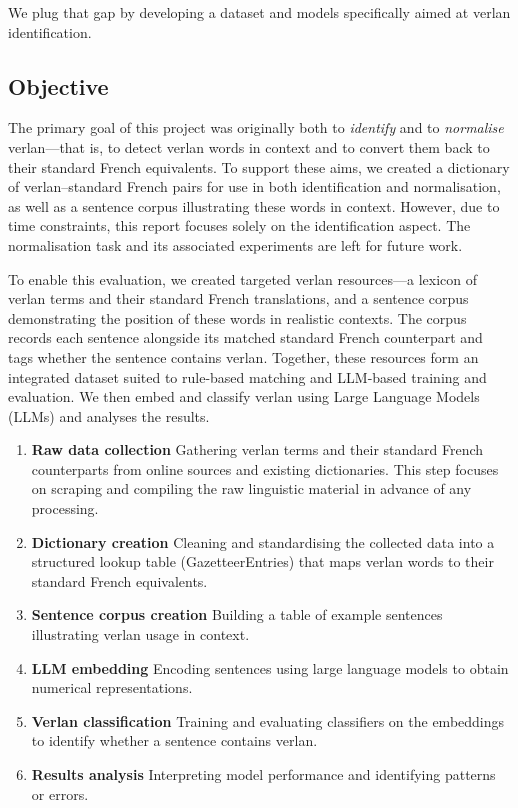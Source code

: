 \documentclass[12pt]{article}
\begin{document}
We plug that gap by developing a dataset and models specifically aimed at verlan identification.

\subsection{Objective}

The primary goal of this project was originally both to \textit{identify} and to \textit{normalise} verlan\;---\;that is, to detect verlan words in context and to convert them back to their standard French equivalents. To support these aims, we created a dictionary of verlan--standard French pairs for use in both identification and normalisation, as well as a sentence corpus illustrating these words in context. However, due to time constraints, this report focuses solely on the identification aspect. The normalisation task and its associated experiments are left for future work.

To enable this evaluation, we created targeted verlan resources\;---\;a lexicon of verlan terms and their standard French translations, and a sentence corpus demonstrating the position of these words in realistic contexts. The corpus records each sentence alongside its matched standard French counterpart and tags whether the sentence contains verlan. Together, these resources form an integrated dataset suited to rule-based matching and LLM-based training and evaluation. We then embed and classify verlan using Large Language Models (LLMs) and analyses the results.

\begin{enumerate}
  \item \textbf{Raw data collection} Gathering verlan terms and their standard French counterparts from online sources and existing dictionaries. This step focuses on scraping and compiling the raw linguistic material in advance of any processing.
  \item \textbf{Dictionary creation} Cleaning and standardising the collected data into a structured lookup table (GazetteerEntries) that maps verlan words to their standard French equivalents.
  \item \textbf{Sentence corpus creation} Building a table of example sentences illustrating verlan usage in context.
  \item \textbf{LLM embedding} Encoding sentences using large language models to obtain numerical representations.
  \item \textbf{Verlan classification} Training and evaluating classifiers on the embeddings to identify whether a sentence contains verlan.
  \item \textbf{Results analysis} Interpreting model performance and identifying patterns or errors.
\end{enumerate}
\end{document}
